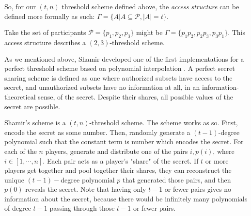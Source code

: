 So, for our $(t,n)$ threshold scheme defined above, the \textit{access structure} can be defined more formally as such: $\Gamma = \{A | A \subseteq \mathcal{P} , |A| = t\}$.

\begin{example}
    Take the set of participants $\mathcal{P} = \{p_1,p_2,p_3\}$ might be $\Gamma = \{p_1p_2,p_2p_3,p_3p_1\}$. This access structure describes a $(2,3)$-threshold scheme.
\end{example}

As we mentioned above, Shamir developed one of the first implementations for a perfect threshold scheme based on polynomial interpolation \cite{shamir_how_1979}. A perfect secret sharing scheme is defined as one where authorized subsets have access to the secret, and unauthorized subsets have no information at all, in an information-theoretical sense, of the secret. Despite their shares, all possible values of the secret are possible.

Shamir's scheme is a $(t,n)$-threshold scheme. The scheme works as so. First, encode the secret as some number. Then, randomly generate a $(t-1)$-degree polynomial such that the constant term is number which encodes the secret. For each of the $n$ players, generate and distribute one of the pairs $i, p(i)$, where $i \in [1, \cdots, n]$. Each pair acts as a player's "share" of the secret. If $t$ or more players get together and pool together their shares, they can reconstruct the unique $(t-1)-$degree polynomial $p$ that generated those pairs, and then $p(0)$ reveals the secret. Note that having only $t-1$ or fewer pairs gives no information about the secret, because there would be infinitely many polynomials of degree $t-1$ passing through those $t-1$ or fewer pairs.